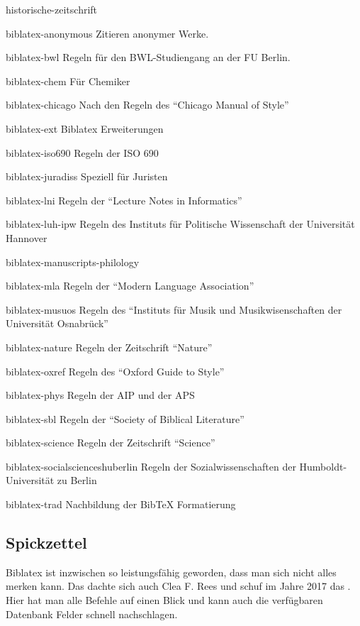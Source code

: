 \begin{labeling}{historische-zeitschrift}
\item[biblatex-anonymous] Zitieren anonymer Werke.
\item[biblatex-bwl]       Regeln für den BWL-Studiengang an der FU Berlin.
\item[biblatex-chem]      Für Chemiker
\item[biblatex-chicago]   Nach den Regeln des \enquote{Chicago Manual of
  Style}
\item[biblatex-ext]       Biblatex Erweiterungen
\item[biblatex-iso690]    Regeln der ISO 690
\item[biblatex-juradiss]  Speziell für Juristen
\item[biblatex-lni]       Regeln der \enquote{Lecture Notes in Informatics}
\item[biblatex-luh-ipw]   Regeln des Instituts für Politische Wissenschaft der Universität Hannover
\item[biblatex-manuscripts-philology]
\item[biblatex-mla]       Regeln der \enquote{Modern Language Association}
\item[biblatex-musuos]    Regeln des \enquote{Instituts für Musik und
  Musikwisenschaften der Universität Osnabrück}
\item[biblatex-nature]    Regeln der Zeitschrift \enquote{Nature}
\item[biblatex-oxref]     Regeln des \enquote{Oxford Guide to Style}
\item[biblatex-phys]      Regeln der AIP und der APS
\item[biblatex-sbl]       Regeln der \enquote{Society of Biblical Literature}
\item[biblatex-science]   Regeln der Zeitschrift \enquote{Science}
\item[biblatex-socialscienceshuberlin] Regeln der Sozialwissenschaften der Humboldt-Universität zu Berlin
\item[biblatex-trad]      Nachbildung der BibTeX Formatierung
\end{labeling}

\subsection{Spickzettel}

Biblatex ist inzwischen so leistungsfähig geworden, dass man sich nicht alles merken kann.
Das dachte sich auch Clea F. Rees und schuf im Jahre 2017 das .
Hier hat man alle  Befehle auf einen Blick und kann auch die verfügbaren Datenbank Felder schnell nachschlagen.

